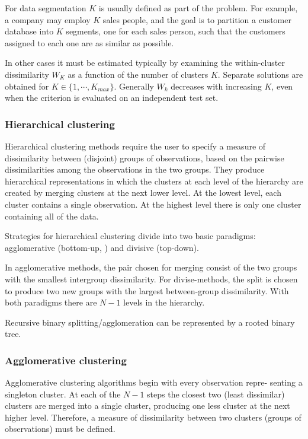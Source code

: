 \documentclass[12pt, letterpaper]{article}
\theoremstyle{definition}
\begin{document}
For data segmentation $K$ is usually defined as part of the problem. For example, a company may employ $K$ sales people, and the goal is to partition a customer database into $K$ segments, one for each sales person, such that the customers assigned to each one are as similar as possible.

In other cases it must be estimated typically by examining the within-cluster dissimilarity $W_K$ as a function of the number of clusters $K$. Separate solutions are obtained for $K \in \{1, \cdots , K_{max}\}$. Generally $W_k$ decreases with increasing $K$, even when the criterion is evaluated on an independent test set.

\subsubsection{Hierarchical clustering}
Hierarchical clustering methods require the user to specify a measure of dissimilarity between (disjoint) groups of observations, based on the pairwise dissimilarities among the observations in the two groups. They produce hierarchical representations in which the clusters at each level of the hierarchy are created by merging clusters at the next lower level. At the lowest level, each cluster contains a single observation. At the highest level there is only one cluster containing all of the data.

Strategies for hierarchical clustering divide into two basic paradigms: agglomerative (bottom-up, ) and divisive (top-down).

In agglomerative methods, the pair chosen for merging consist of the two groups with the smallest intergroup dissimilarity. For divise-methods, the split is chosen to produce two new groups with the largest between-group dissimilarity. With both paradigms there are $N - 1$ levels in the hierarchy.

Recursive binary splitting/agglomeration can be represented by a rooted binary tree. 

\subsubsection{Agglomerative clustering}
Agglomerative clustering algorithms begin with every observation repre- senting a singleton cluster. At each of the $N - 1$ steps the closest two (least dissimilar) clusters are merged into a single cluster, producing one less cluster at the next higher level. Therefore, a measure of dissimilarity between two clusters (groups of observations) must be defined.
\end{document}
